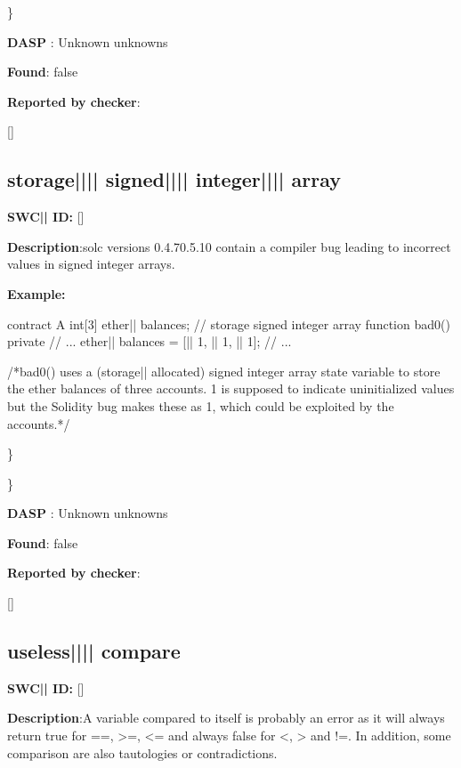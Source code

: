 \documentclass{article}
\begin{document}
\} 

\textbf{DASP} : Unknown unknowns

\textbf{Found}: false

\textbf{Reported by checker}: 
\begin{ffcode} 

[]
\end{ffcode} 
\subsection{storage{||\textunderscore|| }signed{||\textunderscore|| }integer{||\textunderscore|| }array} 
\textbf{SWC{|\textunderscore| }ID:} []

\textbf{Description}:solc versions 0.4.7{\textendash}0.5.10 contain a compiler bug leading to incorrect values in signed integer arrays.


\textbf{Example:} 
\begin{ffcode} 

contract A {
  int[3] ether|\textunderscore| balances; // storage signed integer array
  function bad0() private {
    // ...
    ether|\textunderscore| balances = [|\textendash| 1, |\textendash| 1, |\textendash| 1];
    // ...
  }
}

 /*bad0() uses a (storage|\textendash| allocated) signed integer array state variable to store the ether balances of three accounts. 1 is supposed to indicate uninitialized values but the Solidity bug makes these as 1, which could be exploited by the accounts.*/ 

\end{ffcode} 
\} 

\} 

\textbf{DASP} : Unknown unknowns

\textbf{Found}: false

\textbf{Reported by checker}: 
\begin{ffcode} 

[]
\end{ffcode} 
\subsection{useless{||\textunderscore|| }compare} 
\textbf{SWC{|\textunderscore| }ID:} []

\textbf{Description}:A variable compared to itself is probably an error as it will always return true for ==, >=, <= and always false for <, > and !=. In addition, some comparison are also tautologies or contradictions.
\end{document}
